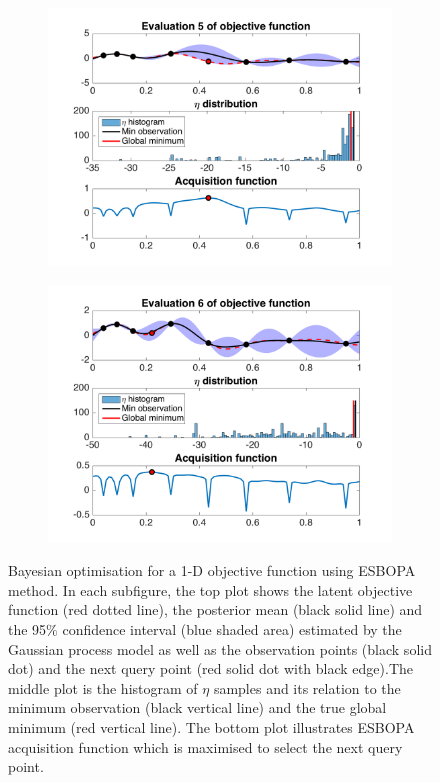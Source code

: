 \documentclass[a4paper,11pt]{report}
\begin{document}
\begin{figure} [p]
\begin{subfigure}{.5\textwidth}
 		 \includegraphics[width=1\linewidth]{ESBOPA_update_eta_prior_seed6_5.png}
	\end{subfigure}	
	\begin{subfigure}{.5\textwidth}
		  \centering
		  \includegraphics[width=1\linewidth]{ESBOPA_update_eta_prior_seed6_6.png}
	\end{subfigure}
\caption{ Bayesian optimisation for a 1-D objective function using ESBOPA method. In each subfigure, the top plot shows the latent objective function (red dotted line), the posterior mean (black solid line) and the 95$\%$ confidence interval (blue shaded area) estimated by the Gaussian process model as well as the observation points (black solid dot) and the next query point (red solid dot with black edge).The middle plot is the histogram of $\eta$ samples and its relation to the minimum observation (black vertical line) and the true global minimum (red vertical line). The bottom plot illustrates ESBOPA acquisition function which is maximised to select the next query point.}
\end{figure}
\end{document}
